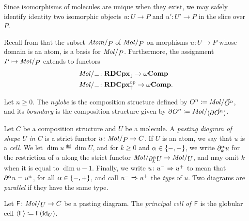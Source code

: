 \begin{rmk}
    Since isomorphisms of molecules are unique when they exist, we may safely identify identity two isomorphic objects \( u \colon U \to P \) and \( u' \colon U' \to P \) in the slice over \( P \).
\end{rmk}

\noindent Recall from \cite[Section 5.2, Section 6]{hadzihasanovic2024combinatorics} that the subset \( \atomin{P} \) of \( \molecin{P} \) on morphisms \( u \colon U \to P \) whose domain is an atom, is a basis for \( \molecin{P} \).
Furthermore, the assignment \( P \mapsto \molecin{P} \) extends to functors
\begin{align*}
    \molecin{-} &\colon \rdcpxmap \to \Comp \\
    \molecin{-} &\colon \opp{\rdcpxcomap} \to \Comp. \\    
\end{align*} 

\begin{dfn} [Globe]
    Let \( n \geq 0 \).
    The \emph{\( n \)\nbd globe} is the composition structure defined by \( \globe{n} \eqdef \molecin{\dglobe{n}} \), and its \emph{boundary} is the composition structure given by \( \bd{}{}\globe{n} \eqdef \molecin{(\bd{}{}\dglobe{n})} \).
\end{dfn}

\begin{dfn} 
    Let \( C \) be a composition structure and \( U \) be a molecule.
    A \emph{pasting diagram of shape \( U \) in \( C \)} is a strict functor \( u \colon \molecin{P} \to C \).
    If \( U \) is an atom, we say that \( u \) is a \emph{cell}.
    We let \( \dim u \eqdef \dim U \), and for \( k \geq 0 \) and \( \alpha \in \left\{ {-, +} \right\} \), we write \( \partial_{k}^{\alpha} u \) for the restriction of \( u \) along the strict functor \( \molecin{\bd{k}{\a} U} \to \molecin{U} \), and may omit \( k \) when it is equal to \( \dim u - 1 \).
    Finally, we write \( u \colon u^- \Rightarrow u^+ \) to mean that \( \partial_{}^{\alpha} u = u^\alpha \), for all \( \alpha \in \left\{ {-, +} \right\} \), and call \( u^- \Rightarrow u^+ \) the \emph{type} of \( u \).
    Two diagrams are \emph{parallel} if they have the same type.
\end{dfn}

\begin{dfn} 
    Let \( \F \colon \molecin{U} \to C \) be a pasting diagram.
    The \emph{principal cell of \( \mathsf{F} \)} is the globular cell \( \langle\mathsf{F}\rangle \coloneqq \mathsf{F}(\mathrm{id}_{U}) \).
\end{dfn}

